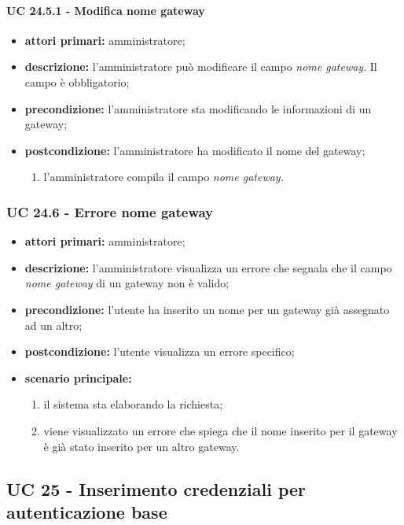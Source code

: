 				\paragraph{UC 24.5.1 - Modifica nome gateway}
				\begin{itemize}
					\item \textbf{attori primari:} amministratore;
					\item \textbf{descrizione:} l'amministratore può modificare il campo \textit{nome gateway}. Il campo è obbligatorio;
					\item \textbf{precondizione:} l'amministratore sta modificando le informazioni di un gateway;
					\item \textbf{postcondizione:} l'amministratore ha modificato il nome del gateway;
					\begin{enumerate}
						\item{l'amministratore compila il campo \textit{nome gateway.}}
					\end{enumerate} 
				\end{itemize}

			\subsubsection{UC 24.6 - Errore nome gateway}
			\begin{itemize}
				\item \textbf{attori primari:} amministratore;
				\item \textbf{descrizione:} l'amministratore visualizza un errore che segnala che il campo \textit{nome gateway} di un gateway non è valido;
				\item \textbf{precondizione:} l'utente ha inserito un nome per un gateway già assegnato ad un altro;
				\item \textbf{postcondizione:} l'utente visualizza un errore specifico;
				\item \textbf{scenario principale:}
				\begin{enumerate}
					\item il sistema sta elaborando la richiesta;
					\item viene visualizzato un errore che spiega che il nome inserito per il gateway è già stato inserito per un altro gateway.
				\end{enumerate}
			\end{itemize}
			
		\subsection{UC 25 - Inserimento credenziali per autenticazione base}
		
